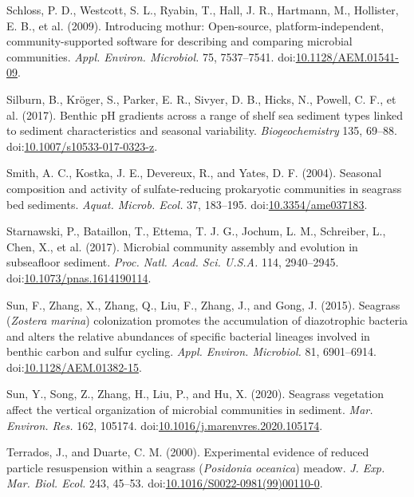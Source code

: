 \documentclass[12pt,]{article}
\begin{document}
\leavevmode\hypertarget{ref-Schloss2009b}{}%
Schloss, P. D., Westcott, S. L., Ryabin, T., Hall, J. R., Hartmann, M.,
Hollister, E. B., et al. (2009). Introducing mothur: Open-source,
platform-independent, community-supported software for describing and
comparing microbial communities. \emph{Appl. Environ. Microbiol.} 75,
7537--7541.
doi:\href{https://doi.org/10.1128/AEM.01541-09}{10.1128/AEM.01541-09}.

\leavevmode\hypertarget{ref-Silburn2017}{}%
Silburn, B., Kröger, S., Parker, E. R., Sivyer, D. B., Hicks, N.,
Powell, C. F., et al. (2017). Benthic pH gradients across a range of
shelf sea sediment types linked to sediment characteristics and seasonal
variability. \emph{Biogeochemistry} 135, 69--88.
doi:\href{https://doi.org/10.1007/s10533-017-0323-z}{10.1007/s10533-017-0323-z}.

\leavevmode\hypertarget{ref-Smith2004a}{}%
Smith, A. C., Kostka, J. E., Devereux, R., and Yates, D. F. (2004).
Seasonal composition and activity of sulfate-reducing prokaryotic
communities in seagrass bed sediments. \emph{Aquat. Microb. Ecol.} 37,
183--195.
doi:\href{https://doi.org/10.3354/ame037183}{10.3354/ame037183}.

\leavevmode\hypertarget{ref-Starnawski2017a}{}%
Starnawski, P., Bataillon, T., Ettema, T. J. G., Jochum, L. M.,
Schreiber, L., Chen, X., et al. (2017). Microbial community assembly and
evolution in subseafloor sediment. \emph{Proc. Natl. Acad. Sci. U.S.A.}
114, 2940--2945.
doi:\href{https://doi.org/10.1073/pnas.1614190114}{10.1073/pnas.1614190114}.

\leavevmode\hypertarget{ref-Sun2015a}{}%
Sun, F., Zhang, X., Zhang, Q., Liu, F., Zhang, J., and Gong, J. (2015).
Seagrass (\emph{Zostera marina}) colonization promotes the accumulation
of diazotrophic bacteria and alters the relative abundances of specific
bacterial lineages involved in benthic carbon and sulfur cycling.
\emph{Appl. Environ. Microbiol.} 81, 6901--6914.
doi:\href{https://doi.org/10.1128/AEM.01382-15}{10.1128/AEM.01382-15}.

\leavevmode\hypertarget{ref-Sun2020}{}%
Sun, Y., Song, Z., Zhang, H., Liu, P., and Hu, X. (2020). Seagrass
vegetation affect the vertical organization of microbial communities in
sediment. \emph{Mar. Environ. Res.} 162, 105174.
doi:\href{https://doi.org/10.1016/j.marenvres.2020.105174}{10.1016/j.marenvres.2020.105174}.

\leavevmode\hypertarget{ref-Terrados2000}{}%
Terrados, J., and Duarte, C. M. (2000). Experimental evidence of reduced
particle resuspension within a seagrass (\emph{Posidonia oceanica})
meadow. \emph{J. Exp. Mar. Biol. Ecol.} 243, 45--53.
doi:\href{https://doi.org/10.1016/S0022-0981(99)00110-0}{10.1016/S0022-0981(99)00110-0}.
\end{document}
